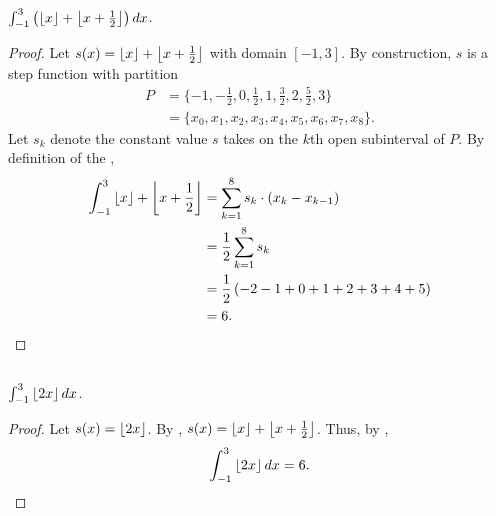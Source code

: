 \documentclass{report}
\begin{document}
\subsection{}%
\label{sub:exercise-1.15.1c}

$\int_{-1}^3 \left(\left\lfloor x\right\rfloor + \left\lfloor x + \frac{1}{2}\right\rfloor\right) \mathop{dx}$.

\begin{proof}

  Let $s(x) = \left\lfloor x\right\rfloor + \left\lfloor x + \frac{1}{2}\right\rfloor$ with domain $[-1, 3]$.
  By construction, $s$ is a step function with partition
    \begin{align*}
      P
        & = \{-1, -\frac{1}{2}, 0, \frac{1}{2}, 1, \frac{3}{2}, 2, \frac{5}{2},
              3\} \\
        & = \{x_0, x_1, x_2, x_3, x_4, x_5, x_6, x_7, x_8\}.
    \end{align*}
  Let $s_k$ denote the constant value $s$ takes on the $k$th open subinterval of
    $P$.
  By definition of the ,
    \begin{align*}
      \int_{-1}^3 \left\lfloor x\right\rfloor + \left\lfloor x + \frac{1}{2}\right\rfloor
        & = \sum_{k=1}^8 s_k \cdot (x_k - x_{k-1}) \\
        & = \frac{1}{2} \sum_{k=1}^8 s_k \\
        & = \frac{1}{2} \left( -2 - 1 + 0 + 1 + 2 + 3 + 4 + 5 \right) \\
        & = 6.
    \end{align*}

\end{proof}

\subsection{}%
\label{sub:exercise-1.15.1e}

$\int_{-1}^3 \left\lfloor2x\right\rfloor \mathop{dx}$.

\begin{proof}

  Let $s(x) = \left\lfloor2x\right\rfloor$.
  By ,
    $s(x) = \left\lfloor x\right\rfloor + \left\lfloor x + \frac{1}{2}\right\rfloor$.
  Thus, by ,
    $$\int_{-1}^3 \left\lfloor2x\right\rfloor \mathop{dx} = 6.$$

\end{proof}

\section{}%
\label{sec:exercise-1.15.3}
\end{document}
